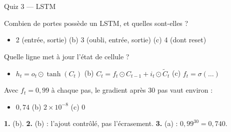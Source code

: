 \begin{frame}{Quiz 3 --- LSTM}
\begin{qbox}[Question 1]
Combien de portes possède un LSTM, et quelles sont-elles ?
\begin{itemize}
  \item[(a)] 2 (entrée, sortie) \quad (b) 3 (oubli, entrée, sortie) \quad
  (c) 4 (dont reset)
\end{itemize}
\end{qbox}
\begin{qbox}[Question 2]
Quelle ligne met à jour l'état de cellule ?
\begin{itemize}
  \item[(a)] $h_t = o_t \odot \tanh(C_t)$ \quad (b) $C_t = f_t \odot C_{t-1} +
  i_t \odot \tilde{C}_t$ \quad (c) $f_t = \sigma(\ldots)$
\end{itemize}
\end{qbox}
\begin{qbox}[Question 3]
Avec $f_t = 0{,}99$ à chaque pas, le gradient après 30 pas vaut environ :
\begin{itemize}
  \item[(a)] $0{,}74$ \quad (b) $2 \times 10^{-8}$ \quad (c) $0$
\end{itemize}
\end{qbox}
\begin{solbox}[Réponses]
\textbf{1.} (b). \quad \textbf{2.} (b) : l'ajout contrôlé, pas l'écrasement. \quad
\textbf{3.} (a) : $0{,}99^{30} = 0{,}740$.
\end{solbox}
\end{frame}
